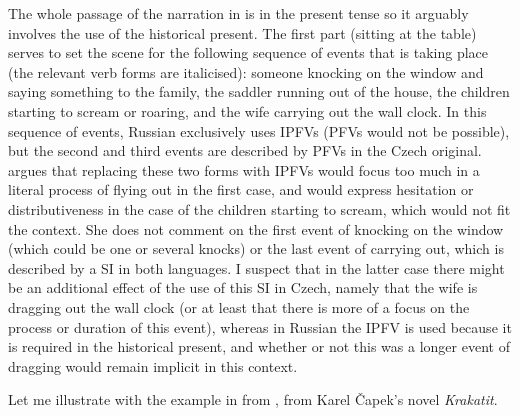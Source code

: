 \documentclass[output=paper,colorlinks,citecolor=brown]{langscibook}
\begin{document}
\noindent The whole passage of the narration in  \citep[from][185]{stunova93} is in the present tense so it arguably involves the use of the historical present. The first part (sitting at the table) serves to set the scene for the following sequence of events that is taking place (the relevant verb forms are italicised): someone knocking on the window and saying something to the family, the saddler running out of the house, the children starting to scream or roaring, and the wife carrying out the wall clock. In this sequence of events, Russian exclusively uses IPFVs (PFVs would not be possible), but the second and third events are described by PFVs in the Czech original. \citeauthor{stunova93} argues that replacing these two forms with IPFVs would focus too much in a literal process of flying out in the first case, and would express hesitation or distributiveness in the case of the children starting to scream, which would not fit the context. She does not comment on the first event of knocking on the window (which could be one or several knocks) or the last event of carrying out, which is described by a SI in both languages. I suspect that in the latter case there might be an additional effect of the use of this SI in Czech, namely that the wife is dragging out the wall clock (or at least that there is more of a focus on the process or duration of this event), whereas in Russian the IPFV is used because it is required in the historical present, and whether or not this was a longer event of dragging would remain implicit in this context.  
\fi

Let me illustrate with the example in  from \citet[][187; my English glosses and translations, context abbreviated]{stunova93}, from Karel Čapek's novel \textit{Krakatit}. %
\end{document}

